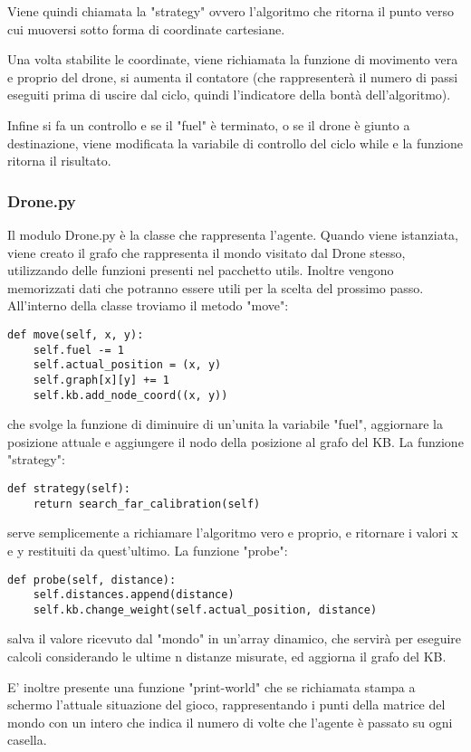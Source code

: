 Viene quindi chiamata la "strategy" ovvero l'algoritmo che ritorna il punto verso cui muoversi sotto forma di coordinate cartesiane. 

Una volta stabilite le coordinate, viene richiamata la funzione di movimento vera e proprio del drone, si aumenta il contatore (che rappresenterà il numero di passi eseguiti prima di uscire dal ciclo, quindi l'indicatore della bontà dell'algoritmo). 

Infine si fa un controllo e se il "fuel" è terminato, o se il drone è giunto a destinazione, viene modificata la variabile di controllo del ciclo while e la funzione ritorna il risultato.

\subsubsection{Drone.py}
Il modulo Drone.py è la classe che rappresenta l'agente. Quando viene istanziata, viene creato il grafo che rappresenta il mondo visitato dal Drone stesso, utilizzando delle funzioni presenti nel pacchetto utils. Inoltre vengono memorizzati dati che potranno essere utili per la scelta del prossimo passo. 
All'interno della classe troviamo il metodo "move":
\begin{verbatim}
def move(self, x, y):
    self.fuel -= 1
    self.actual_position = (x, y)
    self.graph[x][y] += 1
    self.kb.add_node_coord((x, y))
\end{verbatim}
che svolge la funzione di diminuire di un'unita la variabile "fuel", aggiornare la posizione attuale e aggiungere il nodo della posizione al grafo del KB. 
La funzione "strategy":
\begin{verbatim}
def strategy(self):
    return search_far_calibration(self)
\end{verbatim}
serve semplicemente a richiamare l'algoritmo vero e proprio, e ritornare i valori x e y restituiti da quest'ultimo. 
La funzione "probe":
\begin{verbatim}
def probe(self, distance):
    self.distances.append(distance)
    self.kb.change_weight(self.actual_position, distance)
\end{verbatim}
salva il valore ricevuto dal "mondo" in un'array dinamico, che servirà per eseguire calcoli considerando le ultime n distanze misurate, ed aggiorna il grafo del KB. 

E' inoltre presente una funzione "print-world" che se richiamata stampa a schermo l'attuale situazione del gioco, rappresentando i punti della matrice del mondo con un intero che indica il numero di volte che l'agente è passato su ogni casella.

